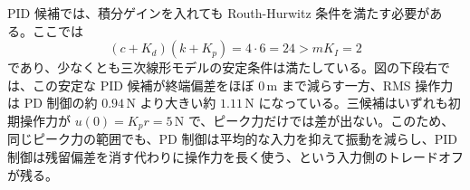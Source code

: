 PID 候補では、積分ゲインを入れても Routh-Hurwitz 条件を満たす必要がある。ここでは
\begin{equation}
  (c+K_d)(k+K_p)=4\cdot6=24>mK_I=2
\end{equation}
であり、少なくとも三次線形モデルの安定条件は満たしている。図の下段右では、この安定な PID 候補が終端偏差をほぼ $0\,\mathrm{m}$ まで減らす一方、RMS 操作力は PD 制御の約 $0.94\,\mathrm{N}$ より大きい約 $1.11\,\mathrm{N}$ になっている。三候補はいずれも初期操作力が $u(0)=K_pr=5\,\mathrm{N}$ で、ピーク力だけでは差が出ない。このため、同じピーク力の範囲でも、PD 制御は平均的な入力を抑えて振動を減らし、PID 制御は残留偏差を消す代わりに操作力を長く使う、という入力側のトレードオフが残る。
